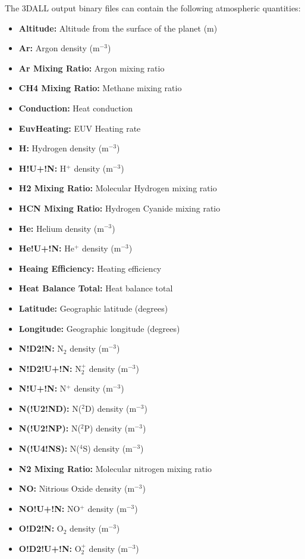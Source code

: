 The 3DALL output binary files can contain the following atmospheric quantities:

\begin{itemize}
\item[]{\bf Altitude:} Altitude from the surface of the planet (m)
\item[]{\bf Ar:} Argon density (m$^{-3}$)
\item[]{\bf Ar Mixing Ratio:} Argon mixing ratio
\item[]{\bf CH4 Mixing Ratio:} Methane mixing ratio
\item[]{\bf Conduction:} Heat conduction
\item[]{\bf EuvHeating:} EUV Heating rate
\item[]{\bf H:} Hydrogen density (m$^{-3}$)
\item[]{\bf H!U+!N:} H$^+$ density (m$^{-3}$)
\item[]{\bf H2 Mixing Ratio:} Molecular Hydrogen mixing ratio
\item[]{\bf HCN Mixing Ratio:} Hydrogen Cyanide mixing ratio
\item[]{\bf He:} Helium density (m$^{-3}$)
\item[]{\bf He!U+!N:} He$^+$ density (m$^{-3}$)
\item[]{\bf Heaing Efficiency:} Heating efficiency
\item[]{\bf Heat Balance Total:} Heat balance total
\item[]{\bf Latitude:} Geographic latitude (degrees)
\item[]{\bf Longitude:} Geographic longitude (degrees)
\item[]{\bf N!D2!N:} N$_2$ density (m$^{-3}$)
\item[]{\bf N!D2!U+!N:} N$_2^+$ density (m$^{-3}$) 
\item[]{\bf N!U+!N:} N$^+$ density (m$^{-3}$)
\item[]{\bf N(!U2!ND):} N($^2$D) density (m$^{-3}$)
\item[]{\bf N(!U2!NP):} N($^2$P) density (m$^{-3}$)
\item[]{\bf N(!U4!NS):} N($^4$S) density (m$^{-3}$)
\item[]{\bf N2 Mixing Ratio:} Molecular nitrogen mixing ratio
\item[]{\bf NO:} Nitrious Oxide density (m$^{-3}$)
\item[]{\bf NO!U+!N:} NO$^+$ density (m$^{-3}$)
\item[]{\bf O!D2!N:} O$_2$ density (m$^{-3}$)
\item[]{\bf O!D2!U+!N:} O$_2^+$ density (m$^{-3}$)

\end{itemize}
